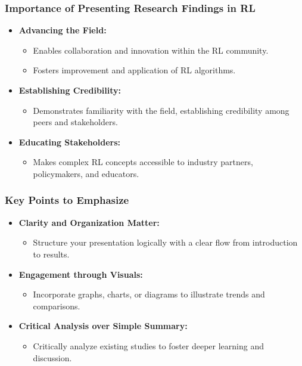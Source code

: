 \documentclass[aspectratio=169]{beamer}
\begin{document}
\begin{frame}[fragile]
    \frametitle{Importance of Presenting Research Findings in RL}
    \begin{itemize}
        \item \textbf{Advancing the Field:}
        \begin{itemize}
            \item Enables collaboration and innovation within the RL community.
            \item Fosters improvement and application of RL algorithms.
        \end{itemize}
        
        \item \textbf{Establishing Credibility:}
        \begin{itemize}
            \item Demonstrates familiarity with the field, establishing credibility among peers and stakeholders.
        \end{itemize}
        
        \item \textbf{Educating Stakeholders:}
        \begin{itemize}
            \item Makes complex RL concepts accessible to industry partners, policymakers, and educators.
        \end{itemize}
    \end{itemize}
\end{frame}

\begin{frame}[fragile]
    \frametitle{Key Points to Emphasize}
    \begin{itemize}
        \item \textbf{Clarity and Organization Matter:}
        \begin{itemize}
            \item Structure your presentation logically with a clear flow from introduction to results.
        \end{itemize}
        
        \item \textbf{Engagement through Visuals:}
        \begin{itemize}
            \item Incorporate graphs, charts, or diagrams to illustrate trends and comparisons.
        \end{itemize}
        
        \item \textbf{Critical Analysis over Simple Summary:}
        \begin{itemize}
            \item Critically analyze existing studies to foster deeper learning and discussion.
        \end{itemize}
    \end{itemize}
\end{frame}
\end{document}
